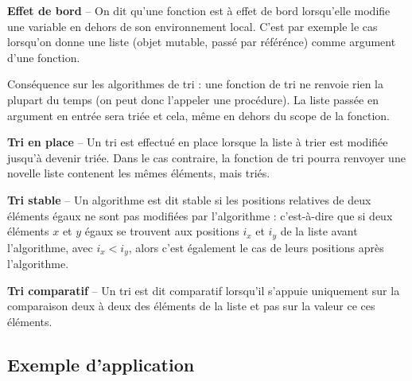 \begin{defi}\small{\textsf{\textbf{Effet de bord }}}--  On dit qu'une fonction est à effet de bord lorsqu'elle modifie une variable  en dehors de son environnement local. C'est par exemple le cas lorsqu'on donne une liste (objet mutable, passé par référénce) comme argument d'une fonction.

Conséquence sur les algorithmes de tri : une fonction de tri ne renvoie rien la plupart du temps (on peut donc l'appeler une procédure). La liste passée en argument en entrée sera triée et cela, même en dehors du scope de la fonction. 
\end{defi}


\begin{defi}\small{\textsf{\textbf{Tri en place}}} -- 
Un tri est effectué en place lorsque la liste à trier est modifiée jusqu'à devenir triée. Dans le cas contraire, la fonction de tri pourra renvoyer une novelle liste contenent les mêmes éléments, mais triés. 
\end{defi}


\begin{defi}\small{\textsf{\textbf{Tri stable}}} -- 
Un algorithme est dit stable si les positions relatives de deux éléments égaux ne sont pas
modifiées par l'algorithme : c'est-à-dire que si deux éléments $x$ et $y$ égaux se trouvent aux positions $i_x$ et $i_y$ de
la liste avant l'algorithme, avec $i_x < i_y$, alors c'est également le cas de leurs positions après l'algorithme.
\end{defi}

\begin{defi}\small{\textsf{\textbf{Tri comparatif}}} --
Un tri est dit comparatif lorsqu'il s'appuie uniquement sur la comparaison deux à deux des éléments de la liste et pas sur la valeur ce ces éléments.
\end{defi}

\subsection{Exemple d'application}


